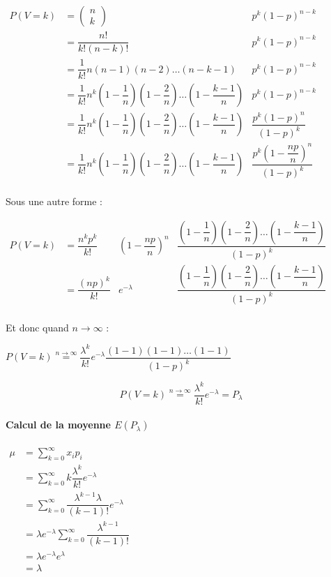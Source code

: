 \begin{center}
$\begin{array}{lll}
P(V=k)&=\left(\begin{array}{c}n\\k\end{array}\right)&p^k(1-p)^{n-k}\\[0.3cm]
      &=\dfrac{n!}{k!(n-k)!}&p^k(1-p)^{n-k}\\[0.3cm]
      &=\dfrac{1}{k!}n(n-1)(n-2)\dots(n-k-1)&p^k(1-p)^{n-k}\\[0.3cm]
      &=\dfrac{1}{k!}n^k\left(1-\dfrac{1}{n}\right)\left(1-\dfrac{2}{n}\right)\dots\left(1-\dfrac{k-1}{n}\right)&p^k(1-p)^{n-k}\\[0.3cm]
      &=\dfrac{1}{k!}n^k\left(1-\dfrac{1}{n}\right)\left(1-\dfrac{2}{n}\right)\dots\left(1-\dfrac{k-1}{n}\right)&\dfrac{p^k\left(1-p\right)^{n}}{(1-p)^k}\\[0.3cm]
      &=\dfrac{1}{k!}n^k\left(1-\dfrac{1}{n}\right)\left(1-\dfrac{2}{n}\right)\dots\left(1-\dfrac{k-1}{n}\right)&\dfrac{p^k\left(1-\dfrac{np}{n}\right)^{n}}{(1-p)^k}\\[0.3cm]
\end{array}$
\end{center}
Sous une autre forme :
\begin{center}
$\begin{array}{llcl}
P(V=k)&=\dfrac{n^kp^k}{k!}&\left(1-\dfrac{np}{n}\right)^n&\dfrac{\left(1-\dfrac{1}{n}\right)\left(1-\dfrac{2}{n}\right)\dots\left(1-\dfrac{k-1}{n}\right)}{(1-p)^k}\\[0.3cm]
&=\dfrac{(np)^k}{k!}&e^{-\lambda}&\dfrac{\left(1-\dfrac{1}{n}\right)\left(1-\dfrac{2}{n}\right)\dots\left(1-\dfrac{k-1}{n}\right)}{(1-p)^k}\\[0.3cm]
\end{array}$
\end{center}
Et donc quand $n\rightarrow\infty$ :
\begin{center}
$P(V=k)\stackrel{n\rightarrow\infty}{=}\dfrac{\lambda^k}{k!}e^{-\lambda}\dfrac{(1-1)(1-1)\dots(1-1)}{(1-p)^k}$
\end{center}
$$\boxed{P(V=k)\stackrel{n\rightarrow\infty}{=}\dfrac{\lambda^k}{k!}e^{-\lambda}=P_\lambda}$$


\paragraph{Calcul de la moyenne $E(P_\lambda)$}
\begin{center}
$\begin{array}{ll}
\mu&=\displaystyle\sum_{k=0}^{\infty}x_ip_i\\
&=\displaystyle\sum_{k=0}^{\infty}k\dfrac{\lambda^k}{k!}e^{-\lambda}\\
&=\displaystyle\sum_{k=0}^{\infty}\dfrac{\lambda^{k-1}\lambda}{(k-1)!}e^{-\lambda}\\
&=\displaystyle\lambda e^{-\lambda}\sum_{k=0}^{\infty}\dfrac{\lambda^{k-1}}{(k-1)!}\\
&=\displaystyle\lambda e^{-\lambda}e^{\lambda}\\
&=\lambda
\end{array}$
\end{center}


